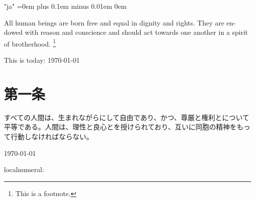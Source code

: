 \documentclass{article}
\begin{document}
\XeTeXlinebreaklocale "ja"
\XeTeXlinebreakskip=0em plus 0.1em minus 0.01em
\parindent0em

\begin{center}
	\abstractname
\end{center}
\begin{english}
All human beings are born free and equal in dignity and rights.
They are endowed with reason and conscience and should act towards one another in a spirit of brotherhood.
\footnote{%
	This is a footnote.}

This is today: \today
\end{english}

\section{第一条}

すべての人間は、生まれながらにして自由であり、かつ、尊厳と権利とについて平等である。人間は、理性と良心とを授けられており、互いに同胞の精神をもって行動しなければならない。

\today

localnumeral: 
\end{document}

